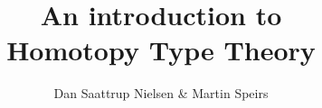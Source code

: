 \documentclass{beamer}
\title[Homotopy Type Theory]{
	An introduction to\\
	Homotopy Type Theory\\
}
\author{Dan Saattrup Nielsen \& Martin Speirs}
\date{}
\begin{document}
\begin{frame}
	\titlepage
\end{frame}



\end{document}
